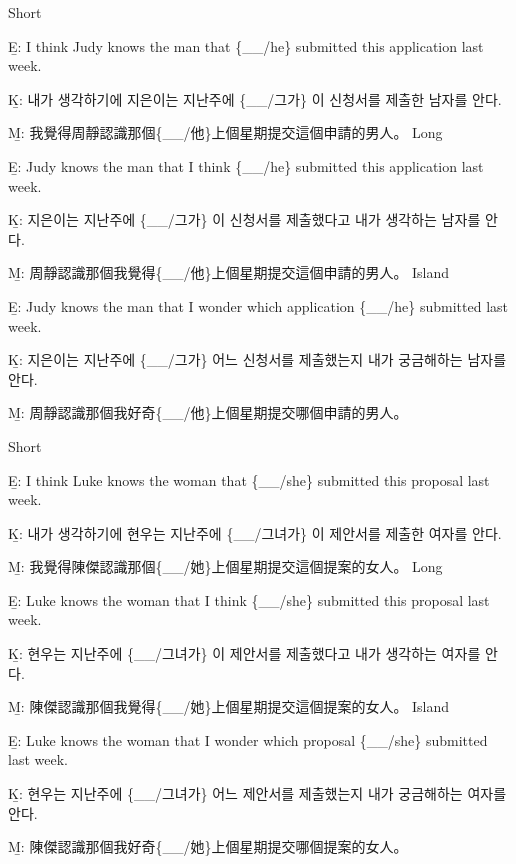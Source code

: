 \pex %
\a Short\par\nobreak
\beginsubsub
\b{E:} I think Judy knows the man that \{\_\_/he\} submitted this application last week.\par\nobreak
\b{K:} \ko 내가 생각하기에 지은이는 지난주에 \{\_\_/그가\} 이 신청서를 제출한 남자를 안다. \normalfont\par\nobreak
\b{M:} \zh 我覺得周靜認識那個\{\_\_/他\}上個星期提交這個申請的男人。 \normalfont
\endsubsub
\a Long\par\nobreak
\beginsubsub
\b{E:} Judy knows the man that I think \{\_\_/he\} submitted this application last week.\par\nobreak
\b{K:} \ko 지은이는 지난주에 \{\_\_/그가\} 이 신청서를 제출했다고 내가 생각하는 남자를 안다. \normalfont\par\nobreak
\b{M:} \zh 周靜認識那個我覺得\{\_\_/他\}上個星期提交這個申請的男人。 \normalfont
\endsubsub
\a Island\par\nobreak
\beginsubsub
\b{E:} Judy knows the man that I wonder which application \{\_\_/he\} submitted last week.\par\nobreak
\b{K:} \ko 지은이는 지난주에 \{\_\_/그가\} 어느 신청서를 제출했는지 내가 궁금해하는 남자를 안다\normalfont.\par\nobreak
\b{M:} \zh 周靜認識那個我好奇\{\_\_/他\}上個星期提交哪個申請的男人。\normalfont
\endsubsub
\xe

\pex %
\a Short\par\nobreak
\beginsubsub
\b{E:} I think Luke knows the woman that \{\_\_/she\} submitted this proposal last week.\par\nobreak
\b{K:} \ko 내가 생각하기에 현우는 지난주에 \{\_\_/그녀가\} 이 제안서를 제출한 여자를 안다. \normalfont\par\nobreak
\b{M:} \zh 我覺得陳傑認識那個\{\_\_/她\}上個星期提交這個提案的女人。 \normalfont
\endsubsub
\a Long\par\nobreak
\beginsubsub
\b{E:} Luke knows the woman that I think \{\_\_/she\} submitted this proposal last week.\par\nobreak
\b{K:} \ko 현우는 지난주에 \{\_\_/그녀가\} 이 제안서를 제출했다고 내가 생각하는 여자를 안다. \normalfont\par\nobreak
\b{M:} \zh 陳傑認識那個我覺得\{\_\_/她\}上個星期提交這個提案的女人。 \normalfont
\endsubsub
\a Island\par\nobreak
\beginsubsub
\b{E:} Luke knows the woman that I wonder which proposal \{\_\_/she\} submitted last week.\par\nobreak
\b{K:} \ko 현우는 지난주에 \{\_\_/그녀가\} 어느 제안서를 제출했는지 내가 궁금해하는 여자를 안다\normalfont.\par\nobreak
\b{M:} \zh 陳傑認識那個我好奇\{\_\_/她\}上個星期提交哪個提案的女人。\normalfont
\endsubsub
\xe

